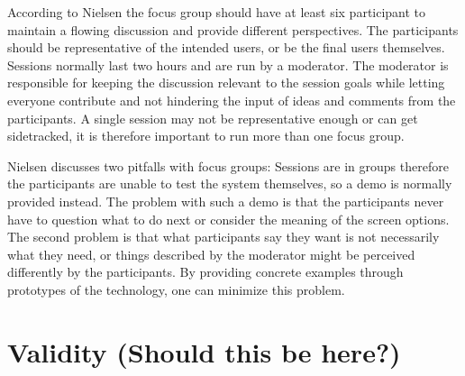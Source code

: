According to Nielsen \cite{focusGroup} the focus group should have at least six participant to maintain a flowing discussion and provide different perspectives. The participants should be representative of the intended users, or be the final users themselves. Sessions normally last two hours and are run by a moderator. The moderator is responsible for keeping the discussion relevant to the session goals while letting everyone contribute and not hindering the input of ideas and comments from the participants. %
A single session may not be representative enough or can get sidetracked, it is therefore important to run more than one focus group.

Nielsen \cite{focusGroup} discusses two pitfalls with focus groups: Sessions are in groups therefore the participants are unable to test the system themselves, so a demo is normally provided instead. The problem with such a demo is that the participants never have to question what to do next or consider the meaning of the screen options. The second problem is that what participants say they want is not necessarily what they need, or things described by the moderator might be perceived differently by the participants. By providing concrete examples through prototypes of the technology, one can minimize this problem.

\section{Validity (Should this be here?)}

